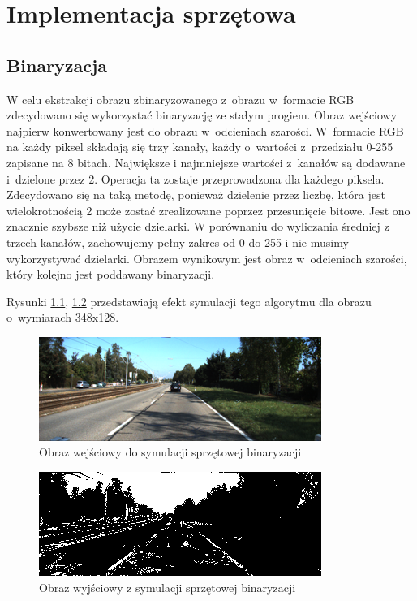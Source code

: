 \chapter{Implementacja sprzętowa}

\section{Binaryzacja}

W celu ekstrakcji obrazu zbinaryzowanego z~obrazu w~formacie RGB zdecydowano się wykorzystać binaryzację ze stałym progiem. 
Obraz wejściowy najpierw konwertowany jest do obrazu w~odcieniach szarości. 
W~formacie RGB na każdy piksel składają się trzy kanały, każdy o~wartości z~przedziału 0-255 zapisane na 8 bitach. 
Największe i najmniejsze wartości z~kanałów są dodawane i~dzielone przez 2. 
Operacja ta zostaje przeprowadzona dla każdego piksela.
Zdecydowano się na taką metodę, ponieważ dzielenie przez liczbę, która jest wielokrotnością 2 może zostać zrealizowane poprzez przesunięcie bitowe. Jest ono znacznie szybsze niż użycie dzielarki. W porównaniu do wyliczania średniej z trzech kanałów, zachowujemy pełny zakres od 0 do 255 i nie musimy wykorzystywać dzielarki.
Obrazem wynikowym jest obraz w~odcieniach szarości, który kolejno jest poddawany binaryzacji.

\noindent Rysunki \ref{fig:in_otsu_fpga}, \ref{fig:out_otsu_fpga} przedstawiają efekt symulacji tego algorytmu dla obrazu o~wymiarach 348x128. 

\begin{figure}[h]
		\centering
		\includegraphics[scale=0.8]{obraz_color_smal.png}
		\caption{Obraz wejściowy do symulacji sprzętowej binaryzacji}
		\label{fig:in_otsu_fpga}
\end{figure}

\begin{figure}[h]
		\centering
		\includegraphics[scale=0.8]{obraz_bin_smal.png}
		\caption{Obraz wyjściowy z symulacji sprzętowej binaryzacji}
		\label{fig:out_otsu_fpga}
\end{figure}

